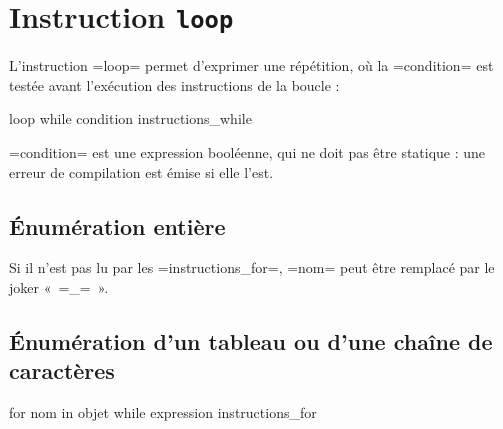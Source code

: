 \section{Instruction \texttt{loop}}

L'instruction \plm=loop= permet d'exprimer une répétition, où la \plm=condition= est testée avant l'exécution des instructions de la boucle :
\begin{PLM}
loop while condition {
  instructions_while
}
\end{PLM}

\plm=condition= est une expression booléenne, qui ne doit pas être statique : une erreur de compilation est émise si elle l'est.














\subsection{Énumération entière}

Si il n'est pas lu par les \plm=instructions_for=, \plm=nom= peut être remplacé par le joker « \plm=_= ».




\subsection{Énumération d'un tableau ou d'une chaîne de caractères}

\begin{PLM}
for nom in objet while expression {
  instructions_for
}
\end{PLM}


























